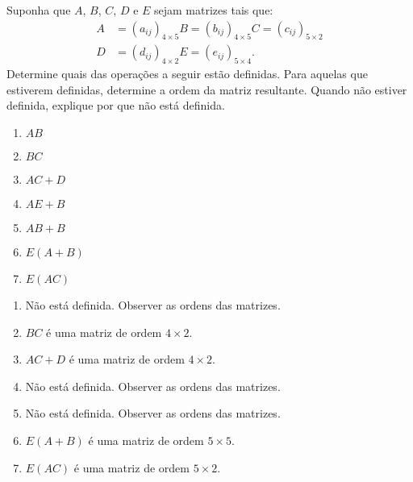 \documentclass[12pt]{exam}
\begin{document}
\begin{exercicio}
    Suponha que $A$, $B$, $C$, $D$ e $E$ sejam matrizes tais que:
    \begin{align*}
        A &= (a_{ij})_{4 \times 5}
        B = (b_{ij})_{4 \times 5}
        C = (c_{ij})_{5 \times 2}\\
        D &= (d_{ij})_{4 \times 2}
        E = (e_{ij})_{5 \times 4}.
    \end{align*}
    Determine quais das operações a seguir estão definidas. Para aquelas que estiverem definidas, determine a ordem da matriz resultante. Quando não estiver definida, explique por que não está definida.
    \begin{multicols}{2}
        \begin{enumerate}[label={\alph*})]
            \item $AB$

            \item $BC$

            \item $AC + D$

            \item $AE + B$

            \item $AB + B$

            \item $E(A + B)$

            \item $E(AC)$
        \end{enumerate}
    \end{multicols}
    \begin{solucao}
        \begin{enumerate}[label={\alph*})]
            \item Não está definida. Observer as ordens das matrizes.
            \item $BC$ é uma matriz de ordem $4 \times 2$.
            \item $AC + D$ é uma matriz de ordem $4 \times 2$.
            \item Não está definida. Observer as ordens das matrizes.
            \item Não está definida. Observer as ordens das matrizes.
            \item $E(A + B)$ é uma matriz de ordem $5 \times 5$.
            \item $E(AC)$ é uma matriz de ordem $5 \times 2$.
        \end{enumerate}
    \end{solucao}
\end{exercicio}
\end{document}
